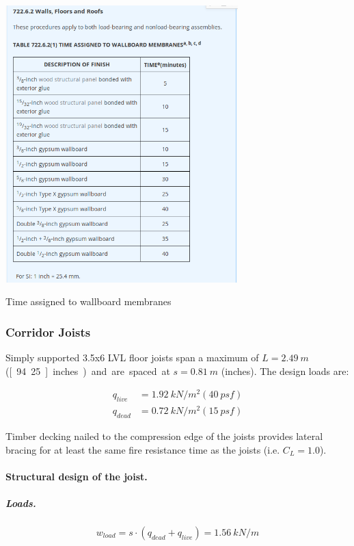 \begin{table}
  \begin{center}
    \includegraphics[width= 90mm]{figures/fire_resistance_wallboard_membranes}
  \end{center}
  \caption{Time assigned to wallboard membranes}\label{tb_fire_resistance_wallboard_membranes}
\end{table}


\subsubsection{Corridor Joists}
Simply supported 3.5x6 LVL floor joists span a maximum of $L= 2.49\ m$ (\unit[94.25]{inches}) and are spaced at $s= 0.81\ m$ (\unit[32]{inches}). The design loads are:

\begin{align}
  q_{live}&= 1.92\ kN/m^2 (40\ psf) \\
  q_{dead}&= 0.72\ kN/m^2 (15\ psf)
\end{align}

Timber decking nailed to the compression edge of the joists provides lateral bracing for at least the same fire resistance time as the joists (i.e. $C_L= 1.0$).

\paragraph{Structural design of the joist.}

\subparagraph{Loads.}

\begin{equation}
  w_{load}= s \cdot (q_{dead}+q_{live})= 1.56\ kN/m
\end{equation}

